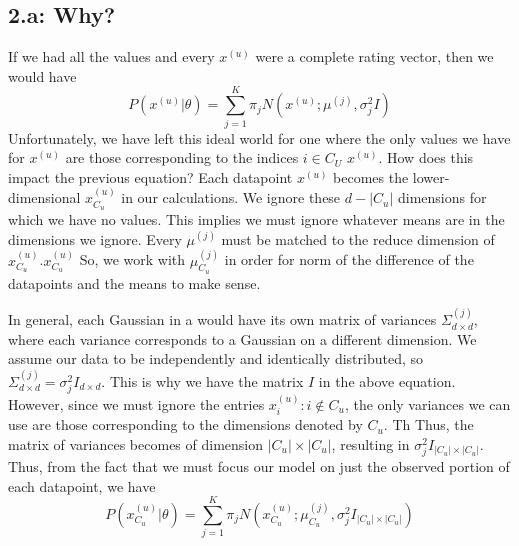 \documentclass{article}
\begin{document}
\subsection*{2.a: Why?} 
If we had all the values and every $x^{(u)}$ were a complete rating vector, then we would have 
\begin{equation*}
  P(x^{(u)}|\theta) = \sum^{K}_{j=1}\pi_jN(x^{(u)} ;\mu^{(j)},\sigma_j^2I )
\end{equation*}
Unfortunately, we have left this ideal world for one where the only values we have for $x^{(u)}$ are those corresponding to the indices $i\in C_U$ $x^{(u)}$. 
How does this impact the previous equation?
Each datapoint $x^{(u)}$ becomes the lower-dimensional $x^{(u)}_{C_u}$ in our calculations. 
We ignore these $d-|C_u|$ dimensions for which we have no values.
This implies we must ignore whatever means are in the dimensions we ignore.
Every $\mu^{(j)}$ must be matched to the reduce dimension of $x^{(u)}_{C_u}$.$x^{(u)}_{C_u}$
So, we work with $\mu^{(j)}_{C_u}$ in order for norm of the difference of the datapoints and the means to make sense. 


In general, each Gaussian in a would have its own matrix of variances $\Sigma_{d\times d}^{(j)}$, where each variance corresponds to a Gaussian on a different dimension. 
We assume our data to be independently and identically distributed, so  $\Sigma_{d\times d}^{(j)} = \sigma_j^2I_{d\times d}$. 
This is why we have the matrix $I$ in the above equation. 
However, since we must ignore the entries $x^{(u)}_i : i \notin C_u$, the only variances we can use are those corresponding to the dimensions denoted by $C_u$. Th
Thus, the matrix of variances becomes of dimension $|C_u|\times |C_u|$, resulting in $\sigma_j^2I_{|C_u|\times |C_u|}$. 
Thus, from the fact that we must focus our model on just the observed portion of each datapoint, we have 
\begin{equation*}
  P(x^{(u)}_{C_u}|\theta) = \sum^{K}_{j=1}\pi_jN(x^{(u)}_{C_u} ;\mu_{C_u}^{(j)},\sigma_j^2I_{|C_u|\times |C_u|} )
\end{equation*}
\end{document}
